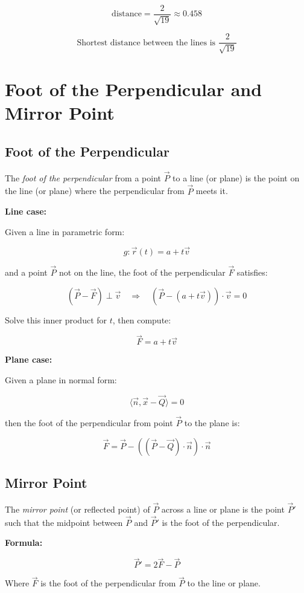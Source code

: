 \[
	\text{distance} = \frac{2}{\sqrt{19}} \approx 0.458
\]

\[
	\text{Shortest distance between the lines is } \frac{2}{\sqrt{19}}
\]

\section{Foot of the Perpendicular and Mirror Point}

\subsection{Foot of the Perpendicular}

The \emph{foot of the perpendicular} from a point \(\vec{P}\) to a line (or plane) is the point on the line (or plane) where 
the perpendicular from \(\vec{P}\) meets it.

\textbf{Line case:}

Given a line in parametric form:

\[
	g: \vec{r}(t) = a + t\vec{v}
\]

and a point \(\vec{P}\) not on the line, the foot of the perpendicular \(\vec{F}\) satisfies:

\[
	(\vec{P} - \vec{F}) \perp \vec{v} \quad \Rightarrow \quad (\vec{P} - (a + t\vec{v})) \cdot \vec{v} = 0
\]

Solve this inner product for \(t\), then compute:

\[
	\vec{F} = a + t\vec{v}
\]

\textbf{Plane case:}

Given a plane in normal form:

\[
	\langle \vec{n}, \vec{x} - \vec{Q} \rangle = 0
\]

then the foot of the perpendicular from point \(\vec{P}\) to the plane is:

\[
	\vec{F} = \vec{P} - ((\vec{P} - \vec{Q}) \cdot \vec{n}) \cdot \vec{n}
\]

\subsection{Mirror Point}

The \emph{mirror point} (or reflected point) of \(\vec{P}\) across a line or plane is the point \(\vec{P}'\) such that the 
midpoint between \(\vec{P}\) and \(\vec{P}'\) is the foot of the perpendicular.

\textbf{Formula:}

\[
	\vec{P}' = 2\vec{F} - \vec{P}
\]

Where \(\vec{F}\) is the foot of the perpendicular from \(\vec{P}\) to the line or plane.
